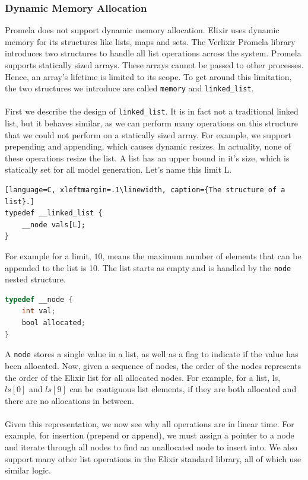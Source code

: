 \subsubsection{Dynamic Memory Allocation}
Promela does not support dynamic memory allocation. Elixir uses dynamic memory for its structures like lists, maps and sets. The Verlixir Promela library introduces two structures to handle all list operations across the system. Promela supports statically sized arrays. These arrays cannot be passed to other processes. Hence, an array's lifetime is limited to its scope. To get around this limitation, the two structures we introduce are called \texttt{memory} and \texttt{linked\_list}.
\\ \\
First we describe the design of \texttt{linked\_list}. It is in fact not a traditional linked list, but it behaves similar, as we can perform many operations on this structure that we could not perform on a statically sized array. For example, we support prepending and appending, which causes dynamic resizes. In actuality, none of these operations resize the list. A list has an upper bound in it's size, which is statically set for all model generation. Let's name this limit L.
\begin{lstlisting}[language=C, xleftmargin=.1\linewidth, caption={The structure of a list}.]
typedef __linked_list {
    __node vals[L];
}
\end{lstlisting}
For example for a limit, $10$, means the maximum number of elements that can be appended to the list is 10. The list starts as empty and is handled by the \texttt{node} nested structure.
\begin{lstlisting}[language=C, xleftmargin=.1\linewidth, caption={Example of a list node typed `int'.}]
typedef __node {
    int val;
    bool allocated;
}
\end{lstlisting}
A \texttt{node} stores a single value in a list, as well as a flag to indicate if the value has been allocated. Now, given a sequence of nodes, the order of the nodes represents the order of the Elixir list for all allocated nodes. For example, for a list, ls, $ls[0]$ and $ls[9]$ can be contiguous list elements, if they are both allocated and there are no allocations in between.
\\ \\
Given this representation, we now see why all operations are in linear time. For example, for insertion (prepend or append), we must assign a pointer to a node and iterate through all nodes to find an unallocated node to insert into. We also support many other list operations in the Elixir standard library, all of which use similar logic.
